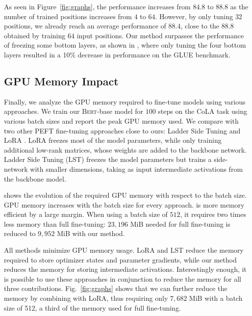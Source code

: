 As seen in Figure~\ref{fig:graphs}, the performance increases from $84.8$ to $88.8$ as the number of trained positions increases from $4$ to $64$. However, by only tuning $32$ positions, we already reach an average performance of $88.4$, close to the $88.8$ obtained by training $64$ input positions.
Our method surpasses the performance of freezing some bottom layers, as shown in \citep{lee_19}, where only tuning the four bottom layers resulted in a 10\% decrease in performance on the GLUE benchmark.








\subsection{GPU Memory Impact} \label{sec:medium:mem}

Finally, we analyze the GPU memory required to fine-tune models using various approaches.  We train our \textsc{Bert}-base model for $100$ steps on the CoLA task using various batch sizes and report the peak GPU memory used. We compare with two other PEFT fine-tuning approaches close to ours: Ladder Side Tuning \citep{sung2022lst} and LoRA \citep{hu_22}. LoRA freezes most of the model parameters, while only training additional low-rank matrices, whose weights are added to the backbone network. Ladder Side Tuning (LST) freezes the model parameters but trains a side-network with smaller dimensions, taking as input intermediate activations from the backbone model.

 shows the evolution of the required GPU memory with respect to the batch size. GPU memory increases with the batch size for every approach. \method is more memory efficient by a large margin. When using a batch size of $512$, it requires two times less memory than full fine-tuning: $23,196$ MiB needed for full fine-tuning is reduced to $9,952$ MiB with our method.

All methods minimize GPU memory usage. LoRA and LST reduce the memory required to store optimizer states and parameter gradients, while our method reduces  the memory for storing intermediate activations. 
Interestingly enough, it is possible to use these approaches in conjunction to reduce the memory for all three contributions. 
Fig.~\ref{fig:graphs} shows that we can further reduce the memory by combining \method with LoRA, thus requiring only $7,682$ MiB with a batch size of 512, a third of the memory used for full fine-tuning.

















